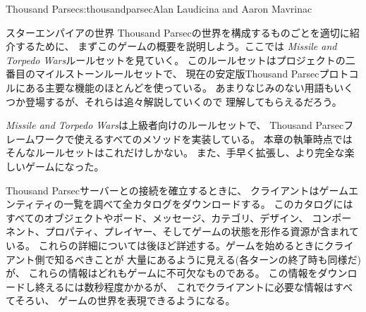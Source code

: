 \begin{aosachapter}{Thousand Parsec}{s:thousandparsec}{Alan Laudicina and Aaron Mavrinac}
\begin{aosasect1}{スターエンパイアの世界}
Thousand Parsecの世界を構成するものごとを適切に紹介するために、
まずこのゲームの概要を説明しよう。ここでは
\emph{Missile and Torpedo Wars}ルールセットを見ていく。
このルールセットはプロジェクトの二番目のマイルストーンルールセットで、
現在の安定版Thousand Parsecプロトコルにある主要な機能のほとんどを使っている。
あまりなじみのない用語もいくつか登場するが、それらは追々解説していくので
理解してもらえるだろう。

\emph{Missile and Torpedo Wars}は上級者向けのルールセットで、
Thousand Parsecフレームワークで使えるすべてのメソッドを実装している。
本章の執筆時点ではそんなルールセットはこれだけしかない。
また、手早く拡張し、より完全な楽しいゲームになった。

Thousand Parsecサーバーとの接続を確立するときに、
クライアントはゲームエンティティの一覧を調べて全カタログをダウンロードする。
このカタログにはすべてのオブジェクトやボード、メッセージ、カテゴリ、デザイン、
コンポーネント、プロパティ、プレイヤー、そしてゲームの状態を形作る資源が含まれている。
これらの詳細については後ほど詳述する。ゲームを始めるときにクライアント側で知るべきことが
大量にあるように見える(各ターンの終了時も同様だ)が、
これらの情報はどれもゲームに不可欠なものである。
この情報をダウンロードし終えるには数秒程度かかるが、
これでクライアントに必要な情報はすべてそろい、
ゲームの世界を表現できるようになる。


\end{aosasect1}
\end{aosachapter}
